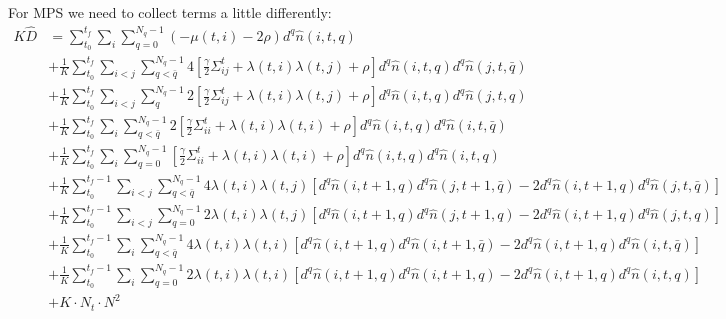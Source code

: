 \documentclass[12pt]{article}
\begin{document}
For MPS we need to collect terms a little differently:
\begin{align}
K\hat{D} &= \sum_{t_0}^{t_f} \sum_i \sum_{q=0}^{N_q-1} (-\mu(t,i) - 2\rho) d^q \hat{n}(i,t,q) \nonumber\\
&+ \frac{1}{K} \sum_{t_0}^{t_f} \sum_{i<j} \sum_{q<\bar{q}}^{N_q-1} 4\left[ \frac{\gamma}{2} {\Sigma^t_{ij}} + \lambda(t,i)\lambda(t,j) + \rho \right] d^q \hat{n}(i,t,q) d^q \hat{n}(j,t,\bar{q}) \nonumber\\
&+ \frac{1}{K} \sum_{t_0}^{t_f} \sum_{i<j} \sum_{q}^{N_q-1} 2\left[ \frac{\gamma}{2} {\Sigma^t_{ij}} + \lambda(t,i)\lambda(t,j) + \rho \right] d^q \hat{n}(i,t,q) d^q \hat{n}(j,t,q) \nonumber\\
&+ \frac{1}{K} \sum_{t_0}^{t_f} \sum_{i} \sum_{q<\bar{q}}^{N_q-1} 2\left[ \frac{\gamma}{2} {\Sigma^t_{ii}} + \lambda(t,i)\lambda(t,i) + \rho \right] d^q \hat{n}(i,t,q) d^q \hat{n}(i,t,\bar{q}) \nonumber\\
&+ \frac{1}{K} \sum_{t_0}^{t_f} \sum_{i} \sum_{q=0}^{N_q-1} \left[ \frac{\gamma}{2} {\Sigma^t_{ii}} + \lambda(t,i)\lambda(t,i) + \rho \right] d^q \hat{n}(i,t,q) d^q \hat{n}(i,t,{q}) \nonumber\\
&+ \frac{1}{K} \sum_{t_0}^{t_f-1} \sum_{i<j} \sum_{q<\bar{q}}^{N_q-1} 4\lambda(t,i)\lambda(t,j) \left[ d^q \hat{n}(i,t+1,q) d^q \hat{n}(j,t+1,\bar{q}) - 2 d^q \hat{n}(i,t+1,q) d^q \hat{n}(j,t,\bar{q}) \right] \nonumber\\    
&+ \frac{1}{K} \sum_{t_0}^{t_f-1} \sum_{i<j} \sum_{q=0}^{N_q-1} 2\lambda(t,i)\lambda(t,j) \left[ d^q \hat{n}(i,t+1,q) d^q \hat{n}(j,t+1,{q}) - 2 d^q \hat{n}(i,t+1,q) d^q \hat{n}(j,t,{q}) \right] \nonumber\\    
&+ \frac{1}{K} \sum_{t_0}^{t_f-1} \sum_{i} \sum_{q<\bar{q}}^{N_q-1}4\lambda(t,i)\lambda(t,i) \left[ d^q \hat{n}(i,t+1,q) d^q \hat{n}(i,t+1,\bar{q}) - 2 d^q \hat{n}(i,t+1,q) d^q \hat{n}(i,t,\bar{q}) \right] \nonumber\\    
&+ \frac{1}{K} \sum_{t_0}^{t_f-1} \sum_{i} \sum_{q=0}^{N_q-1} 2\lambda(t,i)\lambda(t,i) \left[ d^q \hat{n}(i,t+1,q) d^q \hat{n}(i,t+1,{q}) - 2 d^q \hat{n}(i,t+1,q) d^q \hat{n}(i,t,{q}) \right] \nonumber\\ 
&+ K\cdot N_t\cdot N^2 
\end{align}
\end{document}
